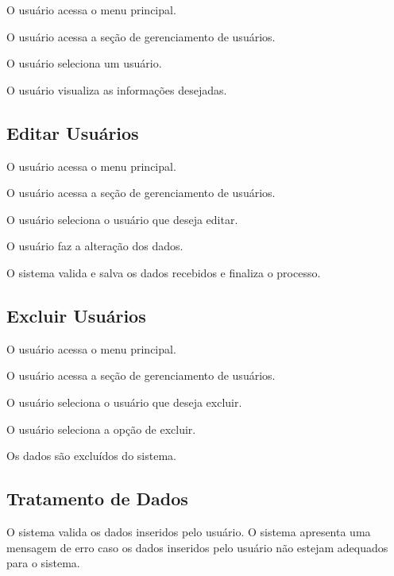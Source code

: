 \documentclass[12pt,a4paper]{article}
\begin{document}
\begin{fluxo}
  \item O usuário acessa o menu principal.
  \item O usuário acessa a seção de gerenciamento de usuários.
  \item O usuário seleciona um usuário.
  \item O usuário visualiza as informações desejadas.
\end{fluxo}

\subsection{Editar Usuários}

\begin{fluxo}
  \item O usuário acessa o menu principal.
  \item O usuário acessa a seção de gerenciamento de usuários.
  \item O usuário seleciona o usuário que deseja editar.
  \item O usuário faz a alteração dos dados.
  \item O sistema valida e salva os dados recebidos e finaliza o processo.
\end{fluxo}

\subsection{Excluir Usuários}

\begin{fluxo}
  \item O usuário acessa o menu principal.
  \item O usuário acessa a seção de gerenciamento de usuários.
  \item O usuário seleciona o usuário que deseja excluir.
  \item O usuário seleciona a opção de excluir.
  \item Os dados são excluídos do sistema.
\end{fluxo}

\subsection{Tratamento de Dados}

O sistema valida os dados inseridos pelo usuário. O sistema apresenta uma
mensagem de erro caso os dados inseridos pelo usuário não estejam adequados
para o sistema.
\end{document}
